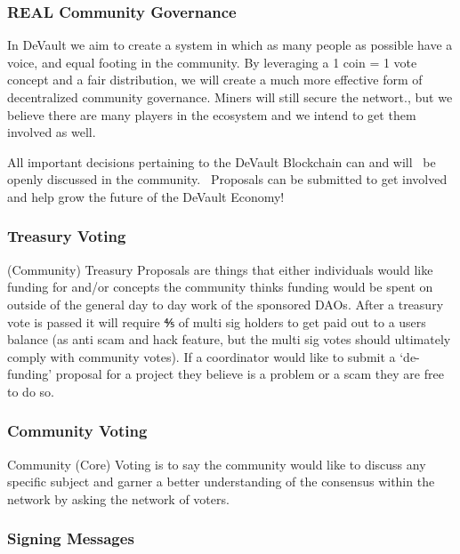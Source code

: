 \hypertarget{h.lbkc9p2n9j2l}{%
\subsubsection{\texorpdfstring{{REAL Community
Governance}}{REAL Community Governance}}\label{h.lbkc9p2n9j2l}}

{In DeVault we aim to create a system in which as many people as
possible have a voice, and equal footing in the community. By leveraging
a 1 coin = 1 vote concept and a fair distribution, we will create a much
more effective form of decentralized community governance. Miners will
still secure the networt., but we believe there are many players in the
ecosystem and we intend to get them involved as well. }

{}

{All important decisions pertaining to the DeVault Blockchain can and
will ~be openly discussed in the community. ~Proposals can be submitted
to get involved and help grow the future of the DeVault Economy! }

\hypertarget{h.6d4jukb50wg9}{%
\subsubsection{\texorpdfstring{{Treasury
Voting}}{Treasury Voting}}\label{h.6d4jukb50wg9}}

{(Community) }{Treasury Proposals are things that either individuals
would like funding for and/or concepts the community thinks funding
would be spent on outside of the general day to day work of the
sponsored DAOs. After a treasury vote is passed it will require ⅘ of
multi sig holders to get paid out to a users balance (as anti scam and
hack feature, but the multi sig votes should ultimately comply with
community votes). If a coordinator would like to submit a `de-funding'
proposal for a project they believe is a problem or a scam they are free
to do so.}

\hypertarget{h.nredut5j8boy}{%
\subsubsection{\texorpdfstring{{Community
Voting}}{Community Voting}}\label{h.nredut5j8boy}}

{Community (Core) Voting is to say the community would like to discuss
any specific subject and garner a better understanding of the consensus
within the network by asking the network of voters.}

\hypertarget{h.rkwe9l9v54p2}{%
\subsubsection{\texorpdfstring{{Signing
Messages}}{Signing Messages}}\label{h.rkwe9l9v54p2}}

